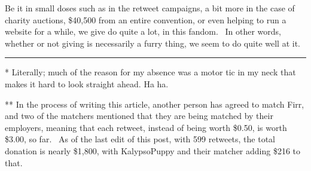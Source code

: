 Be it in small doses such as in the retweet campaigns, a bit more in the
case of charity auctions, \$40,500 from an entire convention, or even
helping to run a website for a while, we give do quite a lot, in this
fandom. ~In other words, whether or not giving is necessarily a furry
thing, we seem to do quite well at it.

\begin{center}\rule{0.5\linewidth}{\linethickness}\end{center}

* Literally; much of the reason for my absence was a motor tic in my
neck that makes it hard to look straight ahead. Ha ha.

** In the process of writing this article, another person has agreed to
match Firr, and two of the matchers mentioned that they are being
matched by their employers, meaning that each retweet, instead of being
worth \$0.50, is worth \$3.00, so far. ~As of the last edit of this
post, with 599 retweets, the total donation is nearly \$1,800, with
KalypsoPuppy and their matcher adding \$216 to that.
